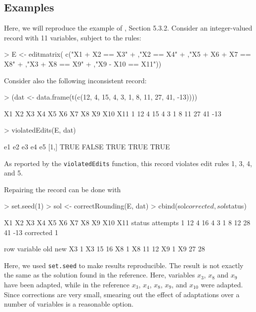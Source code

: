 \documentclass[11pt, fleqn, a4paper]{article}
\begin{document}
\subsection{Examples}
Here, we will reproduce the example of \cite{scholtus:2008}, Section 5.3.2.
Consider an integer-valued record with 11 variables, subject to the rules:
\begin{Schunk}
\begin{Sinput}
> E <- editmatrix( c("X1 + X2 == X3"
+                   ,"X2 == X4"
+                   ,"X5 + X6 + X7 == X8"
+                   ,"X3 + X8 == X9"
+                   ,"X9 - X10 == X11"))
\end{Sinput}
\end{Schunk}
Consider also the following inconsistent record:
\begin{Schunk}
\begin{Sinput}
> (dat <- data.frame(t(c(12, 4, 15, 4, 3, 1, 8, 11, 27, 41, -13))))
\end{Sinput}
\begin{Soutput}
  X1 X2 X3 X4 X5 X6 X7 X8 X9 X10 X11
1 12  4 15  4  3  1  8 11 27  41 -13
\end{Soutput}
\begin{Sinput}
> violatedEdits(E, dat)
\end{Sinput}
\begin{Soutput}
       e1    e2   e3   e4   e5
[1,] TRUE FALSE TRUE TRUE TRUE
\end{Soutput}
\end{Schunk}
As reported by the {\tt violatedEdits} function, this record violates edit rules
1, 3, 4, and 5.  

Repairing the record can be done with
\begin{Schunk}
\begin{Sinput}
> set.seed(1)
> sol <- correctRounding(E, dat)
> cbind(sol$corrected, sol$status)
\end{Sinput}
\begin{Soutput}
  X1 X2 X3 X4 X5 X6 X7 X8 X9 X10 X11    status attempts
1 12  4 16  4  3  1  8 12 28  41 -13 corrected        1
\end{Soutput}
\begin{Soutput}
   row variable old new
X3   1       X3  15  16
X8   1       X8  11  12
X9   1       X9  27  28
\end{Soutput}
\end{Schunk}
Here, we used {\tt set.seed} to make results reproducible. The result is not
exactly the same as the solution found in the reference. Here, variables $x_3$,
$x_8$ and $x_9$ have been adapted, while in the reference $x_3$, $x_4$, $x_8$, 
$x_9$, and $x_{10}$ were adapted.  Since corrections are very small, smearing out the
effect of adaptations over a number of variables is a reasonable option.
\end{document}
